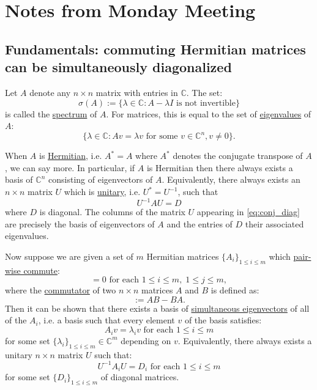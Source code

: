 \documentclass[a4paper]{article}
\begin{document}
\section{Notes from Monday Meeting}

\subsection{Fundamentals: commuting Hermitian matrices can be simultaneously diagonalized} Let $A$ denote any $n \times n$ matrix with entries in $\mathbb{C}$. The set:
\begin{equation}
	\sigma(A) := \{\lambda \in \mathbb{C} : A - \lambda I \text{ is not invertible}\}
\end{equation}
is called the \ul{spectrum} of $A$. For matrices, this is equal to the set of \ul{eigenvalues} of $A$:
\begin{equation}
	\{ \lambda \in \mathbb{C} : A v = \lambda v \text{ for some $v \in \mathbb{C}^n, v \neq 0$}\}.
\end{equation}

When $A$ is \ul{Hermitian}, i.e. $A^* = A$ where $A^*$ denotes the conjugate transpose of $A$, we can say more. In particular, if $A$ is Hermitian then there always exists a basis of $\mathbb{C}^n$ consisting of eigenvectors of $A$. Equivalently, there always exists an $n \times n$ matrix $U$ which is \ul{unitary}, i.e. $U^* = U^{-1}$, such that
\begin{equation} \label{eq:conj_diag}
	U^{-1} A U = D
\end{equation}
where $D$ is diagonal. The columns of the matrix $U$ appearing in \eqref{eq:conj_diag} are precisely the basis of eigenvectors of $A$ and the entries of $D$ their associated eigenvalues.

Now suppose we are given a set of $m$ Hermitian matrices $\{ A_i \}_{1 \leq i \leq m}$ which \ul{pair-wise commute}:
\begin{equation}
	[A_i,A_j] = 0 \text{ for each } 1 \leq i \leq m, \; 1 \leq j \leq m,
\end{equation}
where the \ul{commutator} of two $n \times n$ matrices $A$ and $B$ is defined as:
\begin{equation}
	[ A, B ] := A B - B A.
\end{equation}
Then it can be shown that there exists a basis of \ul{simultaneous eigenvectors} of all of the $A_i$, i.e. a basis such that every element $v$ of the basis satisfies:
\begin{equation}
	A_i v = \lambda_i v \text{ for each } 1 \leq i \leq m
\end{equation}
for some set $\{\lambda_i\}_{1 \leq i \leq m} \in \mathbb{C}^m$ depending on $v$. Equivalently, there always exists a unitary $n \times n$ matrix $U$ such that:
\begin{equation}
	U^{-1} A_i U = D_i \text{ for each } 1 \leq i \leq m
\end{equation}
for some set $\{ D_i \}_{1 \leq i \leq m}$ of diagonal matrices.
\end{document}
